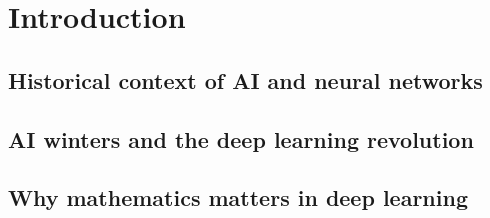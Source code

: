 ﻿\chapter{Introduction}
\section{Historical context of AI and neural networks}

\section{AI winters and the deep learning revolution}

\section{Why mathematics matters in deep learning}


